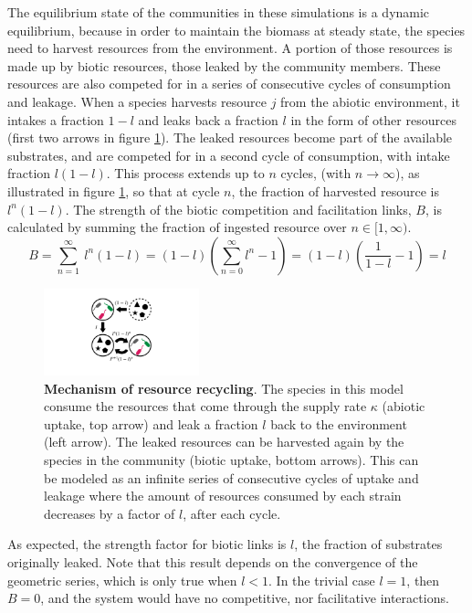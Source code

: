\documentclass[12pt]{article}
\begin{document}
            The equilibrium state of the communities in these simulations is a dynamic equilibrium, because in order to maintain the biomass at steady state, the species need to harvest resources from the environment. A portion of those resources is made up by biotic resources, those leaked by the community members. These resources are also competed for in a series of consecutive cycles of consumption and leakage. When a species harvests resource $j$ from the abiotic environment, it intakes a fraction $1-l$ and leaks back a fraction $l$ in the form of other resources (first two arrows in figure \ref{cycling_scheme}). The leaked resources become part of the available substrates, and are competed for in a second cycle of consumption, with intake fraction $l(1-l)$. This process extends up to $n$ cycles, (with $n \rightarrow \infty$),  as illustrated in figure \ref{cycling_scheme}, so that at cycle $n$, the fraction of harvested resource is $l^n(1-l)$. The strength of the biotic competition and facilitation links, $B$, is calculated by summing the fraction of ingested resource over $n \in [1, \infty)$. 
            \begin{equation}
                B = \sum_{n = 1}^{\infty}\ l^n(1-l)= (1-l)\left(\sum_{n = 0}^\infty l^n -1\right) = (1-l)\left(\frac{1}{1-l} - 1\right) = l
	        \end{equation}
            \begin{figure}[t]
        		\centering
        		\includegraphics[width=0.4\textwidth]{cycling_scheme.pdf}
        		\caption{\textbf{Mechanism of resource recycling}. The species in this model consume the resources that come through the supply rate $\kappa$ (abiotic uptake, top arrow) and leak a fraction $l$ back to the environment (left arrow). The leaked resources can be harvested again by the species in the community (biotic uptake, bottom arrows). This can be modeled as an infinite series of consecutive cycles of uptake and leakage where the amount of resources consumed by each strain decreases by a factor of $l$, after each cycle.}
        		\label{cycling_scheme}
        	\end{figure}
        	As expected, the strength factor for biotic links is $l$, the fraction of substrates originally leaked. Note that this result depends on the convergence of the geometric series, which is only true when $l < 1$. In the trivial case $l = 1$, then $B = 0$, and the system would have no competitive, nor facilitative interactions.
        	
\end{document}
